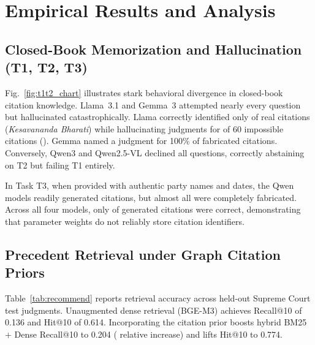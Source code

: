\documentclass[conference]{IEEEtran}
\begin{document}
\section{Empirical Results and Analysis}
\label{sec:results}
\subsection{Closed-Book Memorization and Hallucination (T1, T2, T3)}
Fig.~\ref{fig:t1t2_chart} illustrates stark behavioral divergence in closed-book citation knowledge. Llama~3.1 and Gemma~3 attempted nearly every question but hallucinated catastrophically. Llama correctly identified only \TOneCorrectLlama{} of \TOneN{} real citations (\emph{Kesavananda Bharati}) while hallucinating judgments for \TTwoNamedLlama{} of 60 impossible citations (\TTwoNamedPctLlama). Gemma named a judgment for 100\% of fabricated citations. Conversely, Qwen3 and Qwen2.5-VL declined all questions, correctly abstaining on T2 but failing T1 entirely.

In Task T3, when provided with authentic party names and dates, the Qwen models readily generated citations, but almost all were completely fabricated. Across all four models, only \TThreeCorrectAll{} of \TThreeAskedAll{} generated citations were correct, demonstrating that parameter weights do not reliably store citation identifiers.

\begin{table}[t]
\caption{Precedent Retrieval on \RecNTest{} Held-Out Test Judgments}
\label{tab:recommend}
\centering
\footnotesize
\setlength{\tabcolsep}{6pt}

\end{table}

\begin{table}[t]
\caption{T4 Benchmark Under Five Experimental Conditions: Reference Decisions and Unverified Cases}
\label{tab:t4conds}
\centering
\small
\setlength{\tabcolsep}{7pt}

\end{table}

\subsection{Precedent Retrieval under Graph Citation Priors}
Table~\ref{tab:recommend} reports retrieval accuracy across \RecNTest{} held-out Supreme Court test judgments. Unaugmented dense retrieval (BGE-M3) achieves Recall@10 of 0.136 and Hit@10 of 0.614. Incorporating the citation prior boosts hybrid BM25 + Dense Recall@10 to 0.204 (\RecPriorRelGain{} relative increase) and lifts Hit@10 to 0.774.
\end{document}
